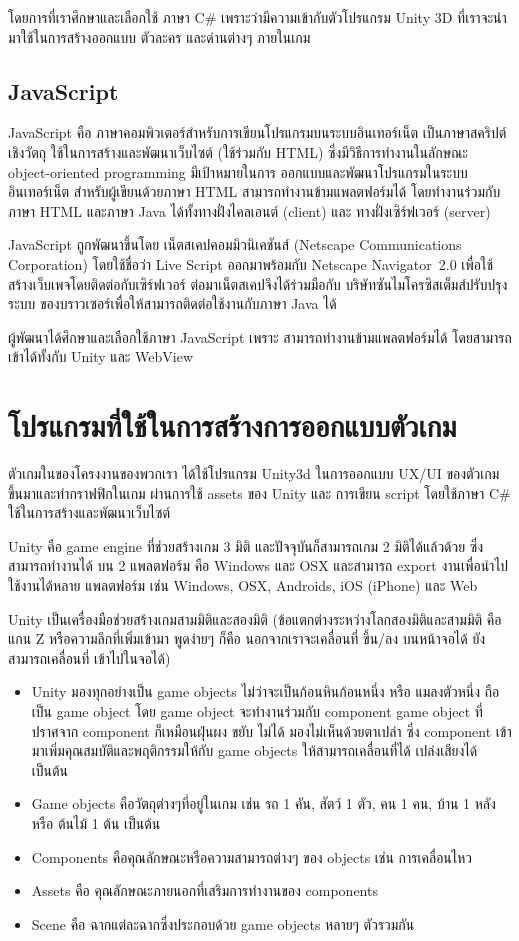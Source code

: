 โดยการที่เราศึกษาและเลือกใช้ ภาษา C\# เพราะว่ามีความเข้ากับตัวโปรแกรม 
Unity 3D ที่เราจะนำมาใช้ในการสร้างออกแบบ ตัวละคร และด่านต่างๆ ภายในเกม

\subsection{JavaScript}
JavaScript คือ ภาษาคอมพิวเตอร์สำหรับการเขียนโปรแกรมบนระบบอินเทอร์เน็ต 
เป็นภาษาสคริปต์เชิงวัตถุ ใช้ในการสร้างและพัฒนาเว็บไซต์ (ใช้ร่วมกับ HTML) 
ซึ่งมีวิธีการทำงานในลักษณะ object-oriented programming มีเป้าหมายในการ 
ออกแบบและพัฒนาโปรแกรมในระบบอินเทอร์เน็ต สำหรับผู้เขียนด้วยภาษา HTML 
สามารถทำงานข้ามแพลตฟอร์มได้ โดยทำงานร่วมกับภาษา HTML และภาษา Java 
ได้ทั้งทางฝั่งไคลเอนต์ (client) และ ทางฝั่งเซิร์ฟเวอร์ (server)

JavaScript ถูกพัฒนาขึ้นโดย เน็ตสเคปคอมมิวนิเคชันส์ 
(Netscape Communications Corporation) 
โดยใช้ชื่อว่า Live Script ออกมาพร้อมกับ Netscape Navigator~2.0 
เพื่อใช้สร้างเว็บเพจโดยติดต่อกับเซิร์ฟเวอร์
ต่อมาเน็ตสเคปจึงได้ร่วมมือกับ บริษัทซันไมโครซิสเต็มส์ปรับปรุงระบบ
ของบราวเซอร์เพื่อให้สามารถติดต่อใช้งานกับภาษา Java ได้~\cite{js}

ผู้พัฒนาได้ศึกษาและเลือกใช้ภาษา JavaScript เพราะ 
สามารถทำงานข้ามแพลตฟอร์มได้ โดยสามารถเข้าได้ทั้งกับ Unity และ WebView

\section{โปรแกรมที่ใช้ในการสร้างการออกแบบตัวเกม}
ตัวเกมในของโครงงานของพวกเรา ได้ใช้โปรแกรม Unity3d
ในการออกแบบ UX/UI ของตัวเกมขึ้นมาและทำกราฟฟิกในเกม 
ผ่านการใช้ assets ของ Unity และ การเขียน script 
โดยใช้ภาษา C\# ใช้ในการสร้างและพัฒนาเว็บไซต์

Unity คือ game engine ที่ช่วยสร้างเกม 3 มิติ 
และปัจจุบันก็สามารถเกม 2 มิติได้แล้วด้วย ซึ่ง 
สามารถทำงานได้ บน 2 แพลตฟอร์ม คือ Windows และ OSX 
และสามารถ export งานเพื่อนำไปใช้งานได้หลาย แพลตฟอร์ม 
เช่น Windows, OSX, Androids, iOS (iPhone) และ Web

Unity เป็นเครื่องมือช่วยสร้างเกมสามมิติและสองมิติ 
(ข้อแตกต่างระหว่างโลกสองมิติและสามมิติ คือแกน Z หรือความลึกที่เพิ่มเข้ามา 
พูดง่ายๆ ก็คือ นอกจากเราจะเคลื่อนที่ ขึ้น/ลง บนหน้าจอได้ ยังสามารถเคลื่อนที่ 
เข้าไปในจอได้)~\cite{unth}
\begin{itemize}
  \item Unity มองทุกอย่างเป็น game objects ไม่ว่าจะเป็นก้อนหินก้อนหนึ่ง 
  หรือ แมลงตัวหนึ่ง ถือเป็น game object โดย game object 
  จะทำงานร่วมกับ component game object ที่ปราศจาก component 
  ก็เหมือนฝุ่นผง ขยับ ไม่ได้ มองไม่เห็นด้วยตาเปล่า ซึ่ง component 
  เข้ามาเพิ่มคุณสมบัติและพฤติกรรมให้กับ game objects ให้สามารถเคลื่อนที่ได้ 
  เปล่งเสียงได้ เป็นต้น
  \item Game objects คือวัตถุต่างๆที่อยู่ในเกม 
  เช่น รถ 1 คัน, สัตว์ 1 ตัว, คน 1 คน, บ้าน 1 หลัง หรือ ต้นไม้ 1 ต้น เป็นต้น
  \item Components คือคุณลักษณะหรือความสามารถต่างๆ ของ objects เช่น การเคลื่อนไหว
  \item Assets คือ คุณลักษณะภายนอกที่เสริมการทำงานของ components
  \item Scene คือ ฉากแต่ละฉากซึ่งประกอบด้วย game objects หลายๆ ตัวรวมกัน
\end{itemize}

